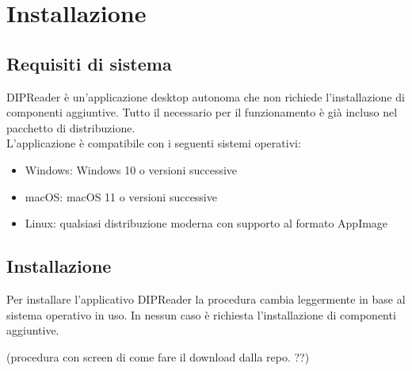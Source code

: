 \documentclass[a4paper,12pt]{article}
\begin{document}
    \section{Installazione}
        \subsection{Requisiti di sistema}
        DIPReader è un'applicazione desktop autonoma che non richiede l'installazione di componenti aggiuntive. Tutto il necessario per il funzionamento è già incluso nel pacchetto di distribuzione. \\

        L'applicazione è compatibile con i seguenti sistemi operativi:
        \begin{itemize}
            \item Windows: Windows 10 o versioni successive
            \item macOS: macOS 11 o versioni successive
            \item Linux: qualsiasi distribuzione moderna con supporto al formato AppImage
        \end{itemize}

        \subsection{Installazione}
            Per installare l'applicativo DIPReader la procedura cambia leggermente in base al sistema operativo in uso. In nessun caso è richiesta l'installazione di componenti aggiuntive.

            (procedura con screen di come fare il download dalla repo. ??)
\end{document}
